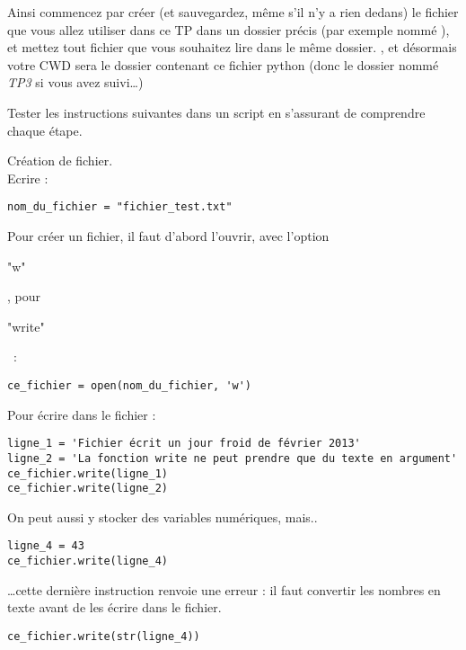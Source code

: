{\begin{itemize}
	      Ainsi  commencez par créer (et sauvegardez, même s'il n'y a rien dedans) le fichier que vous allez utiliser dans ce TP dans un dossier précis (par exemple nommé ), et mettez tout  fichier que vous souhaitez lire dans le même dossier. , et désormais votre CWD sera le dossier contenant ce fichier python (donc le dossier nommé {\em TP3} si vous avez suivi\dots)

\end{itemize}
}

\begin{enonce}
	[Premiers pas]

	Tester les instructions suivantes dans un script en s'assurant de comprendre chaque étape.

	\ques	Création de fichier.\\

	Ecrire :
	\begin{verbatim}nom_du_fichier = "fichier_test.txt"\end{verbatim}

	Pour créer un fichier, il faut d'abord l'ouvrir, avec l'option \begin{texttt}"w"\end{texttt}, pour \begin{texttt}"write"\end{texttt} :\\

	\begin{verbatim}ce_fichier = open(nom_du_fichier, 'w')\end{verbatim}


	Pour écrire dans le fichier :

	\begin{verbatim}ligne_1 = 'Fichier écrit un jour froid de février 2013'
ligne_2 = 'La fonction write ne peut prendre que du texte en argument'
ce_fichier.write(ligne_1)
ce_fichier.write(ligne_2)
\end{verbatim}

	On peut aussi y stocker des variables numériques, mais..

	\begin{verbatim}
ligne_4 = 43
ce_fichier.write(ligne_4)
\end{verbatim}


	\dots cette dernière instruction renvoie une erreur : il faut convertir les nombres en texte avant de les écrire dans le fichier.

	\begin{verbatim}
ce_fichier.write(str(ligne_4))
\end{verbatim}


\end{enonce}
